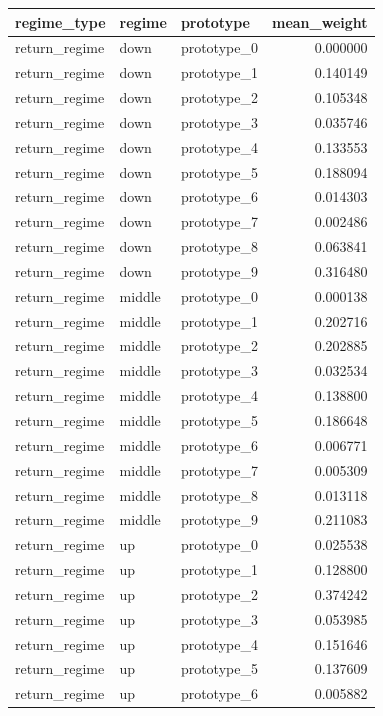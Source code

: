 \begin{tabular}{lllr}
\toprule
regime\_type & regime & prototype & mean\_weight \\
\midrule
return\_regime & down & prototype\_0 & 0.000000 \\
return\_regime & down & prototype\_1 & 0.140149 \\
return\_regime & down & prototype\_2 & 0.105348 \\
return\_regime & down & prototype\_3 & 0.035746 \\
return\_regime & down & prototype\_4 & 0.133553 \\
return\_regime & down & prototype\_5 & 0.188094 \\
return\_regime & down & prototype\_6 & 0.014303 \\
return\_regime & down & prototype\_7 & 0.002486 \\
return\_regime & down & prototype\_8 & 0.063841 \\
return\_regime & down & prototype\_9 & 0.316480 \\
return\_regime & middle & prototype\_0 & 0.000138 \\
return\_regime & middle & prototype\_1 & 0.202716 \\
return\_regime & middle & prototype\_2 & 0.202885 \\
return\_regime & middle & prototype\_3 & 0.032534 \\
return\_regime & middle & prototype\_4 & 0.138800 \\
return\_regime & middle & prototype\_5 & 0.186648 \\
return\_regime & middle & prototype\_6 & 0.006771 \\
return\_regime & middle & prototype\_7 & 0.005309 \\
return\_regime & middle & prototype\_8 & 0.013118 \\
return\_regime & middle & prototype\_9 & 0.211083 \\
return\_regime & up & prototype\_0 & 0.025538 \\
return\_regime & up & prototype\_1 & 0.128800 \\
return\_regime & up & prototype\_2 & 0.374242 \\
return\_regime & up & prototype\_3 & 0.053985 \\
return\_regime & up & prototype\_4 & 0.151646 \\
return\_regime & up & prototype\_5 & 0.137609 \\
return\_regime & up & prototype\_6 & 0.005882 \\

\end{tabular}
